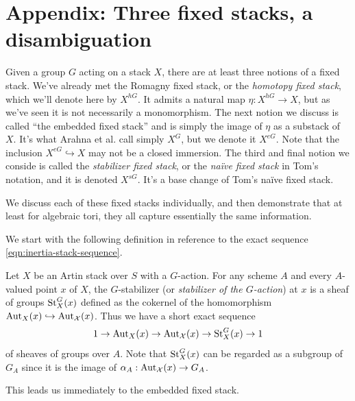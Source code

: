 \documentclass[12pt,dvipsnames]{amsart}
\begin{document}
\newpage

\section{Appendix: Three fixed stacks, a disambiguation}

Given a group \(G\) acting on a stack \(X\), there are at least three notions of a fixed stack. We've already met the Romagny fixed stack, or the \emph{homotopy fixed stack}, which we'll denote here by \(X^{hG}\). It admits a natural map \(\eta:X^{hG}\to X\), but as we've seen it is not necessarily a monomorphism. The next notion we discuss is called ``the embedded fixed stack'' and is simply the image of $\eta$ as a substack of $X$. It's what Arahna et al. call simply $X^G$, but we denote it \(X^{eG}\). Note that the inclusion \(X^{eG}\hookrightarrow X\) may not be a closed immersion. The third and final notion we conside is called the \textit{stabilizer fixed stack}, or the \textit{na\"ive fixed stack} in Tom's notation, and it is denoted \(X^{sG}\). It's a base change of Tom's na\"ive fixed stack.

We discuss each of these fixed stacks individually, and then demonstrate that at least for algebraic tori, they all capture essentially the same information.

We start with the following definition in reference to the exact sequence \eqref{eqn:inertia-stack-sequence}.
\begin{definition}
  Let \(X\) be an Artin stack over \(S\) with a \(G\)-action. For any scheme \(A\) and every \(A\)-valued point \(x\) of \(X\), the \(G\)-stabilizer (or \emph{stabilizer of the \(G\)-action}) at \(x\) is a sheaf of groups \(\operatorname{St}^G_X(x)\) defined as the cokernel of the homomorphism \(\operatorname{Aut}_X(x) \hookrightarrow \operatorname{Aut}_{\mathcal X}(x)\). Thus we have a short exact sequence
  \begin{align*}
    1 \to \operatorname{Aut}_X(x) \to \operatorname{Aut}_{\mathcal X}(x) \to \operatorname{St}^G_X(x) \to 1
  \end{align*}
  of sheaves of groups over \(A\). Note that \(\operatorname{St}^G_X(x)\) can be regarded as a subgroup of \(G_A\) since it is the image of \(\alpha_A:\operatorname{Aut}_{\mathcal X}(x) \to G_A\).
\end{definition}

This leads us immediately to the embedded fixed stack.
\end{document}
